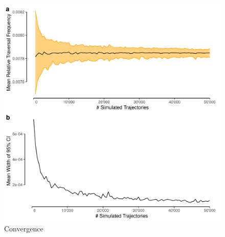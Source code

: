 \documentclass[abstract=on,10pt,a4paper,bibliography=totocnumbered]{article}
\begin{document}
\begin{figure}
  \begin{center}
    \includegraphics[width=\textwidth]{99_Convergence}
    \caption{Convergence}
    \label{Convergence}
  \end{center}
\end{figure}

\end{document}
